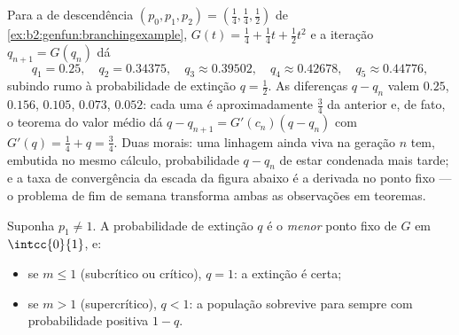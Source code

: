 \begin{example}
\label{ex:b2:genfun:cobwebnumerics}
Para a  de descendência $(p_0, p_1, p_2) = (\tfrac14,
\tfrac14, \tfrac12)$ de \cref{ex:b2:genfun:branchingexample},
$G(t) = \tfrac14 + \tfrac14t + \tfrac12t^2$ e a iteração
$q_{n+1} = G(q_n)$ dá
\[
q_1 = 0.25, \quad q_2 = 0.34375, \quad q_3 \approx 0.39502,
\quad q_4 \approx 0.42678, \quad q_5 \approx 0.44776,
\]
subindo rumo à probabilidade de extinção $q = \tfrac12$.
As diferenças $q - q_n$ valem $0.25$, $0.156$, $0.105$, $0.073$,
$0.052$: cada uma é aproximadamente $\tfrac34$ da anterior e,
de fato, o teorema do valor médio dá $q - q_{n+1} = G'(c_n)(q
- q_n)$ com $G'(q) = \tfrac14 + q = \tfrac34$. Duas morais: uma
linhagem ainda viva na geração $n$ tem, embutida
no mesmo cálculo, probabilidade $q - q_n$ de estar condenada
mais tarde; e a taxa de convergência da escada da
figura abaixo é a derivada no ponto fixo --- o
problema de fim de semana transforma ambas as observações em teoremas.
\end{example}

\begin{theorem}\label{thm:b2:genfun:extinction}
Suponha $p_1 \neq 1$. A probabilidade de extinção $q$ é o
\emph{menor} ponto fixo de $G$ em $\intcc{0}{1}$, e:
\begin{itemize}
\item se $m \leq 1$ (subcrítico ou crítico), $q = 1$: a extinção
é certa;
\item se $m > 1$ (supercrítico), $q < 1$: a população sobrevive
para sempre com probabilidade positiva $1 - q$.
\end{itemize}
\end{theorem}

